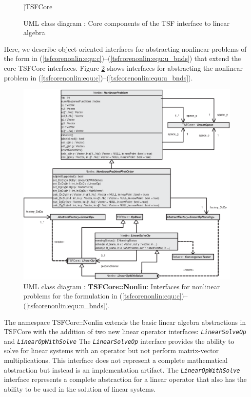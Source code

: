 {\begin{figure}[t]
\begin{center}
]{TSFCore}
\end{center}
\caption{
\label{tsfcorenonlin:fig:tsfcore}
UML class diagram : Core components of the TSF
interface to linear algebra
}
\end{figure}
\esinglespace}
%
Here, we describe object-oriented interfaces for abstracting
nonlinear problems of the form in
(\ref{tsfcorenonlin:equ:c})--(\ref{tsfcorenonlin:equ:u_bnds}) that
extend the core TSFCore interfaces.  Figure
\ref{tsfcorenonlin:fig:NonlinearProblem} shows interfaces for abstracting the
nonlinear problem in (\ref{tsfcorenonlin:equ:c})--(\ref{tsfcorenonlin:equ:u_bnds}).
%
{\bsinglespace
\begin{figure}
\begin{center}
\includegraphics*[bb= 0.0in 0.0in 7.55in 7.0in,angle=0,scale=0.65
]{TSFCoreNonlin}
\end{center}
\caption{
\label{tsfcorenonlin:fig:NonlinearProblem}
UML \cite{ref:booch_et_al_1999} class diagram : \textbf{TSFCore::Nonlin}:
Interfaces for nonlinear problems for the formulation in
(\ref{tsfcorenonlin:equ:c})--(\ref{tsfcorenonlin:equ:u_bnds}).
}
\end{figure}
\esinglespace}
%
The namespace TSFCore::Nonlin extends the basic linear algebra abstractions
in TSFCore with the addition of two new linear operator interfaces:
\texttt{\textit{Linear\-Solve\-Op}} and \texttt{\textit{Linear\-Op\-With\-Solve}}
The \texttt{\textit{Linear\-Solve\-Op}} interface provides the ability
to solve for linear systems with an operator but not perform
matrix-vector multiplications.  This interface does not represent a
complete mathematical abstraction but instead is an implementation
artifact.  The \texttt{\textit{Linear\-Op\-With\-Solve}} interface
represents a complete abstraction for a linear operator that also has
the ability to be used in the solution of linear systems.

